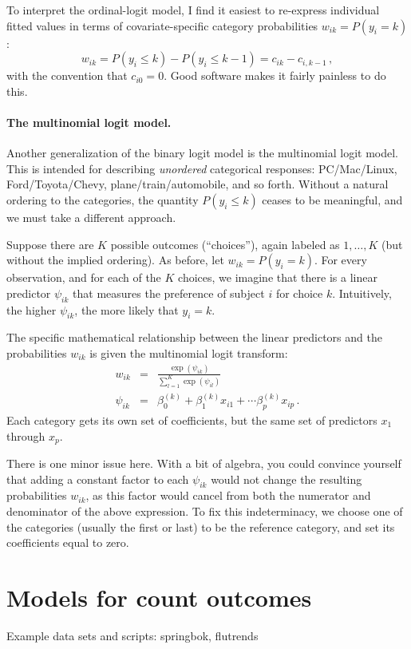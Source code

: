 \documentclass[11pt]{article}
\newcommand{\1}[1]{\mathbf{1}_{\{ {#1} \}}}
\begin{document}
To interpret the ordinal-logit model, I find it easiest to re-express individual fitted values in terms of covariate-specific category probabilities $w_{ik} = P(y_i = k)$:
$$
w_{ik} =  P(y_i  \leq k) - P(y_i \leq k-1) = c_{ik} - c_{i, k-1} \, ,
$$
with the convention that $c_{i0} = 0$. Good software makes it fairly painless to do this.


\paragraph{The multinomial logit model.}

Another generalization of the binary logit model is the multinomial logit model.  This is intended for describing \textit{unordered} categorical responses: PC/Mac/Linux, Ford/Toyota/Chevy, plane/train/automobile, and so forth.  Without a natural ordering to the categories, the quantity $P(y_i \leq k)$ ceases to be meaningful, and we must take a different approach.

Suppose there are $K$ possible outcomes (``choices''), again labeled as $1, \ldots, K$ (but without the implied ordering).  As before, let $w_{ik} = P(y_i = k)$.   For every observation, and for each of the $K$ choices, we imagine that there is a linear predictor $\psi_{ik}$ that measures the preference of subject $i$ for choice $k$.  Intuitively, the higher $\psi_{ik}$, the more likely that $y_i = k$.

The specific mathematical relationship between the linear predictors and the probabilities $w_{ik}$ is given the multinomial logit transform:
\begin{eqnarray*}
w_{ik} &=& \frac{\exp(\psi_{ik})}{ \sum_{l=1}^K \exp(\psi_{il}) } \\
\psi_{ik} &=& \beta_0^{(k)} + \beta_1^{(k)} x_{i1} + \cdots \beta_p^{(k)} x_{ip} \, .
\end{eqnarray*}
Each category gets its own set of coefficients, but the same set of predictors $x_1$ through $x_p$.

There is one minor issue here.  With a bit of algebra, you could convince yourself that adding a constant factor to each $\psi_{ik}$ would not change the resulting probabilities $w_{ik}$, as this factor would cancel from both the numerator and denominator of the above expression.  To fix this indeterminacy, we choose one of the categories (usually the first or last) to be the reference category, and set its coefficients equal to zero.


\section{Models for count outcomes}
Example data sets and scripts: springbok, flutrends
\end{document}
